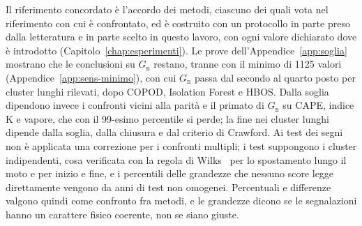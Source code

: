 Il riferimento concordato è l'accordo dei metodi, ciascuno dei quali vota nel riferimento con cui è confrontato, ed è costruito con un protocollo in parte preso dalla letteratura e in parte scelto in questo lavoro, con ogni valore dichiarato dove è introdotto (Capitolo~\ref{chap:esperimenti}). Le prove dell'Appendice~\ref{app:soglia} mostrano che le conclusioni su $G_{\mathrm{n}}$ restano, tranne con il minimo di 1125 valori (Appendice~\ref{app:sens-minimo}), con cui $G_{\mathrm{n}}$ passa dal secondo al quarto posto per cluster lunghi rilevati, dopo COPOD, Isolation Forest e HBOS. Dalla soglia dipendono invece i confronti vicini alla parità e il primato di $G_{\mathrm{n}}$ su CAPE, indice K e vapore, che con il 99-esimo percentile si perde; la fine nei cluster lunghi dipende dalla soglia, dalla chiusura e dal criterio di Crawford. Ai test dei segni non è applicata una correzione per i confronti multipli; i test suppongono i cluster indipendenti, cosa verificata con la regola di Wilks~\cite{wilks1997resampling} per lo spostamento lungo il moto e per inizio e fine, e i percentili delle grandezze che nessuno score legge direttamente vengono da anni di test non omogenei. Percentuali e differenze valgono quindi come confronto fra metodi, e le grandezze dicono se le segnalazioni hanno un carattere fisico coerente, non se siano giuste.

